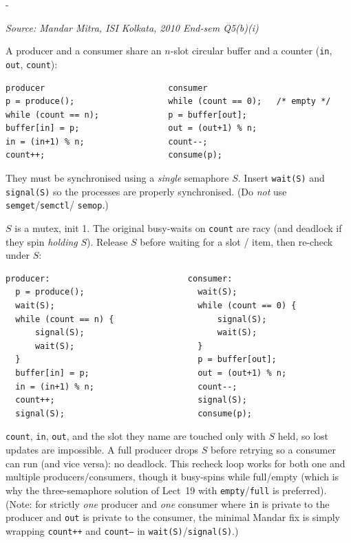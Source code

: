 \documentclass[11pt,a4paper]{article}
\makeatletter
\newcommand{\keepspace}[1]{\par\penalty-100\begingroup
  \setlength{\dimen@}{#1}\dimen@ii\pagegoal\advance\dimen@ii-\pagetotal
  \ifdim\dimen@>\dimen@ii\ifdim\dimen@ii>\z@\vfil\fi\break\fi\endgroup}
\newcounter{qn}[section]
\newenvironment{Qn}[4]{%
  \refstepcounter{qn}\keepspace{7\baselineskip}%
  \begin{tcolorbox}[qboxstyle, title={Q\thesection.\theqn\ \ [#1 \textbar\ #2]\ \ #4}]%
  {\footnotesize\color{g3}\textit{Source: #3}}\par\smallskip%
}{%
  \end{tcolorbox}%
}
\newenvironment{Sol}{%
  \begin{tcolorbox}[sboxstyle, title={Solution}]%
}{%
  \end{tcolorbox}\vspace{0.35em}%
}
\makeatother
\begin{document}
\begin{Qn}{Medium-Hard}{Lect 19}{Mandar Mitra, ISI Kolkata, 2010 End-sem Q5(b)(i)}{Bounded buffer with a \emph{single} semaphore}
A producer and a consumer share an $n$-slot circular buffer and a counter
(\texttt{in}, \texttt{out}, \texttt{count}):
\begin{lstlisting}[numbers=none]
producer                         consumer
p = produce();                   while (count == 0);   /* empty */
while (count == n);              p = buffer[out];
buffer[in] = p;                  out = (out+1) % n;
in = (in+1) % n;                 count--;
count++;                         consume(p);
\end{lstlisting}
They must be synchronised using a \emph{single} semaphore $S$. Insert
\texttt{wait(S)} and \texttt{signal(S)} so the processes are properly
synchronised. (Do \emph{not} use \texttt{semget}/\texttt{semctl}/
\texttt{semop}.)
\end{Qn}
\begin{Sol}
$S$ is a mutex, init 1. The original busy-waits on \texttt{count} are
racy (and deadlock if they spin \emph{holding} $S$). Release $S$ before
waiting for a slot / item, then re-check under $S$:
\begin{lstlisting}[numbers=none]
producer:                            consumer:
  p = produce();                       wait(S);
  wait(S);                             while (count == 0) {
  while (count == n) {                     signal(S);
      signal(S);                           wait(S);
      wait(S);                         }
  }                                    p = buffer[out];
  buffer[in] = p;                      out = (out+1) % n;
  in = (in+1) % n;                     count--;
  count++;                             signal(S);
  signal(S);                           consume(p);
\end{lstlisting}
\texttt{count}, \texttt{in}, \texttt{out}, and the slot they name are
touched only with $S$ held, so lost updates are impossible. A full
producer drops $S$ before retrying so a consumer can run (and vice versa):
no deadlock. This recheck loop works for both one and multiple producers/consumers,
though it busy-spins while full/empty (which is why the three-semaphore
solution of Lect~19 with \texttt{empty}/\texttt{full} is preferred).
(Note: for strictly \emph{one} producer and \emph{one} consumer where
\texttt{in} is private to the producer and \texttt{out} is private to the
consumer, the minimal Mandar fix is simply wrapping \texttt{count++} and
\texttt{count--} in \texttt{wait(S)}/\texttt{signal(S)}.)
\end{Sol}
\end{document}
